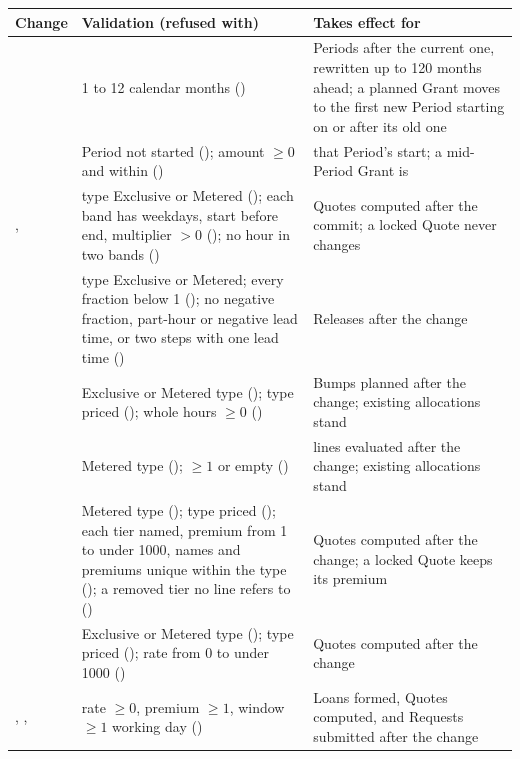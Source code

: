 
{\footnotesize\setlength{\tabcolsep}{4pt}\renewcommand{\arraystretch}{1.1}
\begin{tabularx}{\textwidth}{@{}L{3.6cm}YL{4.8cm}@{}}
\toprule
\textbf{Change} & \textbf{Validation (refused with)} & \textbf{Takes effect for} \\
\midrule
{} & 1 to 12 calendar months () & Periods after the current one, rewritten up to 120 months ahead; a planned Grant moves to the first new Period starting on or after its old one \\
 & Period not started (); amount $\ge 0$ and within  () & that Period's start; a mid-Period Grant is  \\
,  & type Exclusive or Metered (); each band has weekdays, start before end, multiplier $> 0$ (); no hour in two bands () & Quotes computed after the commit; a locked Quote never changes \\
 & type Exclusive or Metered; every fraction below 1 (); no negative fraction, part-hour or negative lead time, or two steps with one lead time () & Releases after the change \\
 & Exclusive or Metered type (); type priced (); whole hours $\ge 0$ () & Bumps planned after the change; existing allocations stand \\
 & Metered type (); $\ge 1$ or empty () & lines evaluated after the change; existing allocations stand \\
 & Metered type (); type priced (); each tier named, premium from 1 to under 1000, names and premiums unique within the type (); a removed tier no line refers to () & Quotes computed after the change; a locked Quote keeps its premium \\
 & Exclusive or Metered type (); type priced (); rate from 0 to under 1000 () & Quotes computed after the change \\
, ,  & rate $\ge 0$, premium $\ge 1$, window $\ge 1$ working day () & Loans formed, Quotes computed, and Requests submitted after the change \\
\bottomrule
\end{tabularx}\par}

